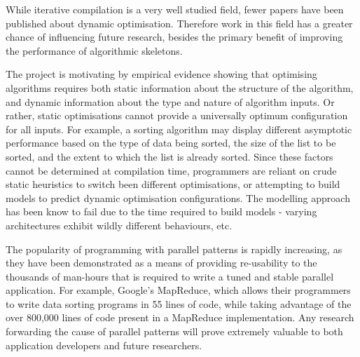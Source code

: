 

While iterative compilation is a very well studied field, fewer papers
have been published about dynamic optimisation. Therefore work in this
field has a greater chance of influencing future research, besides the
primary benefit of improving the performance of algorithmic skeletons.

The project is motivating by empirical evidence showing that
optimising algorithms requires both static information about the
structure of the algorithm, and dynamic information about the type and
nature of algorithm inputs. Or rather, static optimisations cannot
provide a universally optimum configuration for all inputs. For
example, a sorting algorithm may display different asymptotic
performance based on the type of data being sorted, the size of the
list to be sorted, and the extent to which the list is already
sorted. Since these factors cannot be determined at compilation time,
programmers are reliant on crude static heuristics to switch been
different optimisations, or attempting to build models to predict
dynamic optimisation configurations. The modelling approach has been
know to fail due to the time required to build models - varying
architectures exhibit wildly different behaviours, etc.



The popularity of programming with parallel patterns is rapidly
increasing, as they have been demonstrated as a means of providing
re-usability to the thousands of man-hours that is required to write a
tuned and stable parallel application. For example, Google's
MapReduce, which allows their programmers to write data sorting
programs in 55 lines of code, while taking advantage of the over
800,000 lines of code present in a MapReduce implementation. Any
research forwarding the cause of parallel patterns will prove
extremely valuable to both application developers and future
researchers.


